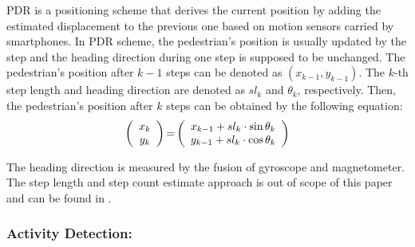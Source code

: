 \documentclass{llncs}
\begin{document}
PDR is a positioning scheme that derives the current position by adding the estimated displacement to the previous one based on motion sensors carried by smartphones. In PDR scheme, the pedestrian's position is usually updated by the step and the heading direction during one step is supposed to be unchanged. The pedestrian's position after $k-1$ steps can be denoted as $(x_{k-1},y_{k-1})$. The $k$-th step length and heading direction are denoted as $sl_k$ and $\theta_k$, respectively. Then, the pedestrian's position after $k$ steps can be obtained by the following equation:
\begin{equation}
\label{equ_pdr}
\left( {\begin{array}{*{20}{c}}
	{{x_k}}\\
	{{y_k}}
	\end{array}} \right){\rm{ = }}\left( {\begin{array}{*{20}{c}}
	{{x_{k - 1}} + s{l_k} \cdot \sin {\theta _k}}\\
	{{y_{k - 1}} + s{l_k} \cdot \cos {\theta _k}}
	\end{array}} \right)
\end{equation}


The heading direction is measured by the fusion of gyroscope and magnetometer. The step length and step count estimate approach is out of scope of this paper and can be found in \cite{wang2012no}. 

\subsubsection{Activity Detection:}
\end{document}
